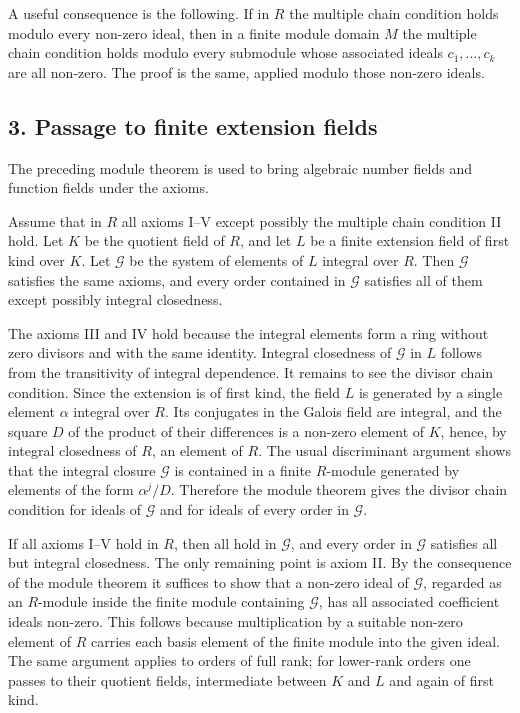 \documentclass[11pt]{article}
\begin{document}
A useful consequence is the following. If in $R$ the multiple chain condition holds modulo every non-zero ideal, then in a finite module domain $M$ the multiple chain condition holds modulo every submodule whose associated ideals $c_1,\ldots,c_k$ are all non-zero. The proof is the same, applied modulo those non-zero ideals.

\subsection{3. Passage to finite extension fields}

The preceding module theorem is used to bring algebraic number fields and function fields under the axioms.

Assume that in $R$ all axioms I--V except possibly the multiple chain condition II hold. Let $K$ be the quotient field of $R$, and let $L$ be a finite extension field of first kind over $K$. Let $\mathcal G$ be the system of elements of $L$ integral over $R$. Then $\mathcal G$ satisfies the same axioms, and every order contained in $\mathcal G$ satisfies all of them except possibly integral closedness.

The axioms III and IV hold because the integral elements form a ring without zero divisors and with the same identity. Integral closedness of $\mathcal G$ in $L$ follows from the transitivity of integral dependence. It remains to see the divisor chain condition. Since the extension is of first kind, the field $L$ is generated by a single element $\alpha$ integral over $R$. Its conjugates in the Galois field are integral, and the square $D$ of the product of their differences is a non-zero element of $K$, hence, by integral closedness of $R$, an element of $R$. The usual discriminant argument shows that the integral closure $\mathcal G$ is contained in a finite $R$-module generated by elements of the form $\alpha^j/D$. Therefore the module theorem gives the divisor chain condition for ideals of $\mathcal G$ and for ideals of every order in $\mathcal G$.

If all axioms I--V hold in $R$, then all hold in $\mathcal G$, and every order in $\mathcal G$ satisfies all but integral closedness. The only remaining point is axiom II. By the consequence of the module theorem it suffices to show that a non-zero ideal of $\mathcal G$, regarded as an $R$-module inside the finite module containing $\mathcal G$, has all associated coefficient ideals non-zero. This follows because multiplication by a suitable non-zero element of $R$ carries each basis element of the finite module into the given ideal. The same argument applies to orders of full rank; for lower-rank orders one passes to their quotient fields, intermediate between $K$ and $L$ and again of first kind.
\end{document}
